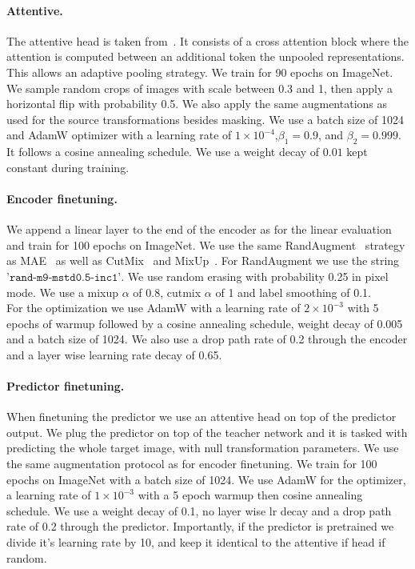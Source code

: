 \documentclass[twocolumn]{fairmeta}
\theoremstyle{plain}
\theoremstyle{definition}
\theoremstyle{remark}
\begin{document}
\paragraph{Attentive.}
The attentive head is taken from~\cite{chen2023context}. It consists of a cross attention block where the attention is computed between an additional token the unpooled representations. This allows an adaptive pooling strategy.
We train for 90 epochs on ImageNet. We sample random crops of images with scale between 0.3 and 1, then apply a horizontal flip with probability 0.5. We also apply the same augmentations as used for the source transformations besides masking.
We use a batch size of 1024 and AdamW optimizer with a learning rate of $1\times 10^{-4}$,$\beta_1 = 0.9$, and $\beta_2 = 0.999$. It follows a cosine annealing schedule. We use a weight decay of $0.01$ kept constant during training.

\paragraph{Encoder finetuning.}
We append a linear layer to the end of the encoder as for the linear evaluation and train for 100 epochs on ImageNet. We use the same RandAugment~\citep{2020RandAug} strategy as MAE~\citep{he2021mae} as well as CutMix~\citep{yun2019cutmix} and MixUp~\citep{zhang2018mixup}. For RandAugment we use the string $\texttt{'rand-m9-mstd0.5-inc1'}$. We use random erasing with probability 0.25 in pixel mode. We use a mixup $\alpha$ of 0.8, cutmix $\alpha$ of 1 and label smoothing of 0.1.\\
For the optimization we use AdamW with a learning rate of $2\times 10^{-3}$ with 5 epochs of warmup followed by a cosine annealing schedule, weight decay of 0.005 and a batch size of 1024. We also use a drop path rate of 0.2 through the encoder and a layer wise learning rate decay of 0.65.

\paragraph{Predictor finetuning.}
When finetuning the predictor we use an attentive head on top of the predictor output. We plug the predictor on top of the teacher network and it is tasked with predicting the whole target image, with null transformation parameters. We use the same augmentation protocol as for encoder finetuning. We train for 100 epochs on ImageNet with a batch size of 1024. We use AdamW for the optimizer, a learning rate of $1\times 10^{-3}$ with a 5 epoch warmup then cosine annealing schedule. We use a weight decay of 0.1, no layer wise lr decay and a drop path rate of 0.2 through the predictor.
Importantly, if the predictor is pretrained we divide it's learning rate by 10, and keep it identical to the attentive if head if random.
\end{document}
